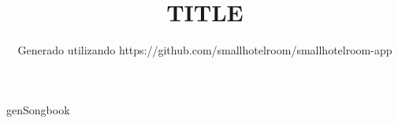 \documentclass[11pt,a4paper,openany]{book}  %
\begin{document}
\frontmatter

\Large

\title{TITLE}
\author{Generado utilizando https://github.com/smallhotelroom/smallhotelroom-app}

\maketitle
\cleardoublepage
\tableofcontents
\newpage

\mainmatter

genSongbook

\backmatter

\end{document}
